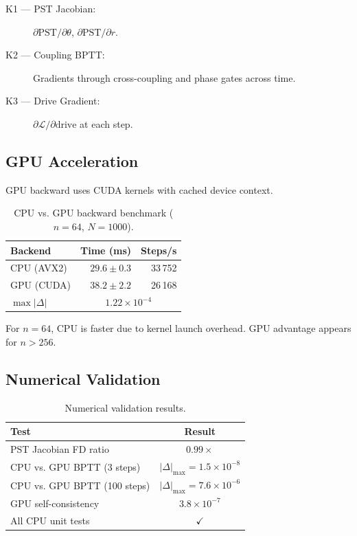 \documentclass[twocolumn,10pt]{article}
\newcommand{\cL}{\mathcal{L}}
\begin{document}
\begin{description}
  \item[K1 --- PST Jacobian:] $\partial\text{PST}/\partial\theta$, $\partial\text{PST}/\partial r$.
  \item[K2 --- Coupling BPTT:] Gradients through cross-coupling and phase gates across time.
  \item[K3 --- Drive Gradient:] $\partial\cL/\partial\text{drive}$ at each step.
\end{description}

\subsection{GPU Acceleration}

GPU backward uses CUDA kernels with cached device context.

\begin{table}[h]
\centering
\caption{CPU vs. GPU backward benchmark ($n=64$, $N=1000$).}
\begin{tabular}{lrr}
\toprule
Backend & Time (ms) & Steps/s \\
\midrule
CPU (AVX2) & $29.6 \pm 0.3$ & 33\,752 \\
GPU (CUDA) & $38.2 \pm 2.2$ & 26\,168 \\
\midrule
$\max|\Delta|$ & \multicolumn{2}{c}{$1.22\times10^{-4}$} \\
\bottomrule
\end{tabular}
\end{table}

For $n=64$, CPU is faster due to kernel launch overhead. GPU advantage appears for $n > 256$.

\subsection{Numerical Validation}

\begin{table}[h]
\centering
\caption{Numerical validation results.}
\begin{tabular}{lc}
\toprule
Test & Result \\
\midrule
PST Jacobian FD ratio & $0.99\times$ \\
CPU vs. GPU BPTT (3 steps) & $|\Delta|_{\max} = 1.5\times10^{-8}$ \\
CPU vs. GPU BPTT (100 steps) & $|\Delta|_{\max} = 7.6\times10^{-6}$ \\
GPU self-consistency & $3.8\times10^{-7}$ \\
All CPU unit tests & $\checkmark$ \\
\bottomrule
\end{tabular}
\end{table}
\end{document}
